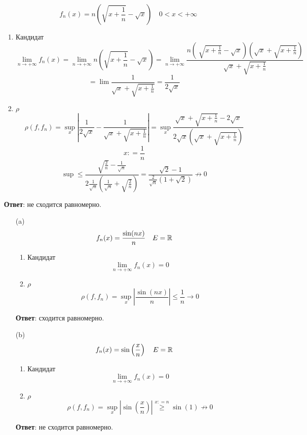 \begin{exercise}[2754]
    \[f_n(x) = n\left( \sqrt{x + \frac{1}{n}} - \sqrt{x} \right) \quad 0 < x < +\infty\]

    \begin{enumerate}
        \item Кандидат
              \[\lim_{n\to +\infty} f_n(x) = \lim_{n\to +\infty} n\left( \sqrt{x + \frac{1}{n}} - \sqrt{x} \right) = \lim_{n\to +\infty} \frac{n\left(\ \sqrt{x + \frac{1}{n}} - \sqrt{x} \right)\left( \sqrt{x} + \sqrt{x + \frac{1}{n}} \right)}{\sqrt{x} + \sqrt{x + \frac{1}{n}}} \]
              \[ = \lim \frac{1}{\sqrt{x} + \sqrt{x + \frac{1}{n}}} = \frac{1}{2 \sqrt{x}}\]
        \item \(\rho\)
              \[\rho(f, f_n) = \sup_{x} \left|\frac{1}{2 \sqrt{x}} - \frac{1}{\sqrt{x} + \sqrt{x + \frac{1}{n}}}\right| = \sup_{x} \frac{\sqrt{x} + \sqrt{x + \frac{1}{n}} - 2 \sqrt{x}}{2 \sqrt{x}\left(\sqrt{x} + \sqrt{x + \frac{1}{n}}\right)}\]
              \[x: = \frac{1}{n}\]
              \[\sup \leq \frac{\sqrt{\frac{2}{n}} - \frac{1}{\sqrt{n}}}{2 \frac{1}{\sqrt{n}} (\frac{1}{\sqrt{n}} + \sqrt{\frac{2}{n}})} = \frac{\sqrt{2} - 1}{\frac{2}{\sqrt{n}}(1 + \sqrt{2})}\not\to 0\]
    \end{enumerate}

    \textbf{Ответ}: не сходится равномерно.
\end{exercise}

\begin{exercise}[2755]
    \begin{itemize}
        \item [(a)] \[f_n(x) = \frac{\sin(nx)}{n} \quad E = \mathbb{R}\]

              \begin{enumerate}
                  \item Кандидат
                        \[\lim_{n\to +\infty} f_n(x) = 0\]
                  \item \(\rho\)
                        \[\rho(f, f_n) = \sup_{x} \left|\frac{\sin(nx)}{n}\right| \leq \frac{1}{n}\to 0\]
              \end{enumerate}

              \textbf{Ответ}: сходится равномерно.

        \item [(b)] \[f_n(x) = \sin\left( \frac{x}{n} \right) \quad E = \mathbb{R}\]

              \begin{enumerate}
                  \item Кандидат
                        \[\lim_{n\to +\infty} f_n(x) = 0\]
                  \item \(\rho\)
                        \[\rho(f, f_n) = \sup_{x} \left|\sin\left( \frac{x}{n} \right)\right| \stackrel{x: = n}{ \ge } \sin(1) \not\to 0\]
              \end{enumerate}

              \textbf{Ответ}: не сходится равномерно.
    \end{itemize}
\end{exercise}

